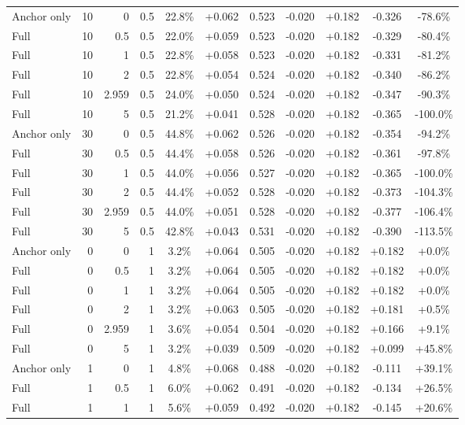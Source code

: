 \begin{table}[htbp]
\begin{tabular}{lrrrccccccc}
Anchor only & 10 & 0 & 0.5 & 22.8\% & +0.062 & 0.523 & -0.020 & +0.182 & -0.326 & -78.6\% \\
Full & 10 & 0.5 & 0.5 & 22.0\% & +0.059 & 0.523 & -0.020 & +0.182 & -0.329 & -80.4\% \\
Full & 10 & 1 & 0.5 & 22.8\% & +0.058 & 0.523 & -0.020 & +0.182 & -0.331 & -81.2\% \\
Full & 10 & 2 & 0.5 & 22.8\% & +0.054 & 0.524 & -0.020 & +0.182 & -0.340 & -86.2\% \\
Full & 10 & 2.959 & 0.5 & 24.0\% & +0.050 & 0.524 & -0.020 & +0.182 & -0.347 & -90.3\% \\
Full & 10 & 5 & 0.5 & 21.2\% & +0.041 & 0.528 & -0.020 & +0.182 & -0.365 & -100.0\% \\
Anchor only & 30 & 0 & 0.5 & 44.8\% & +0.062 & 0.526 & -0.020 & +0.182 & -0.354 & -94.2\% \\
Full & 30 & 0.5 & 0.5 & 44.4\% & +0.058 & 0.526 & -0.020 & +0.182 & -0.361 & -97.8\% \\
Full & 30 & 1 & 0.5 & 44.0\% & +0.056 & 0.527 & -0.020 & +0.182 & -0.365 & -100.0\% \\
Full & 30 & 2 & 0.5 & 44.4\% & +0.052 & 0.528 & -0.020 & +0.182 & -0.373 & -104.3\% \\
Full & 30 & 2.959 & 0.5 & 44.0\% & +0.051 & 0.528 & -0.020 & +0.182 & -0.377 & -106.4\% \\
Full & 30 & 5 & 0.5 & 42.8\% & +0.043 & 0.531 & -0.020 & +0.182 & -0.390 & -113.5\% \\
Anchor only & 0 & 0 & 1 & 3.2\% & +0.064 & 0.505 & -0.020 & +0.182 & +0.182 & +0.0\% \\
Full & 0 & 0.5 & 1 & 3.2\% & +0.064 & 0.505 & -0.020 & +0.182 & +0.182 & +0.0\% \\
Full & 0 & 1 & 1 & 3.2\% & +0.064 & 0.505 & -0.020 & +0.182 & +0.182 & +0.0\% \\
Full & 0 & 2 & 1 & 3.2\% & +0.063 & 0.505 & -0.020 & +0.182 & +0.181 & +0.5\% \\
Full & 0 & 2.959 & 1 & 3.6\% & +0.054 & 0.504 & -0.020 & +0.182 & +0.166 & +9.1\% \\
Full & 0 & 5 & 1 & 3.2\% & +0.039 & 0.509 & -0.020 & +0.182 & +0.099 & +45.8\% \\
Anchor only & 1 & 0 & 1 & 4.8\% & +0.068 & 0.488 & -0.020 & +0.182 & -0.111 & +39.1\% \\
Full & 1 & 0.5 & 1 & 6.0\% & +0.062 & 0.491 & -0.020 & +0.182 & -0.134 & +26.5\% \\
Full & 1 & 1 & 1 & 5.6\% & +0.059 & 0.492 & -0.020 & +0.182 & -0.145 & +20.6\% \\

\end{tabular}
\end{table}
